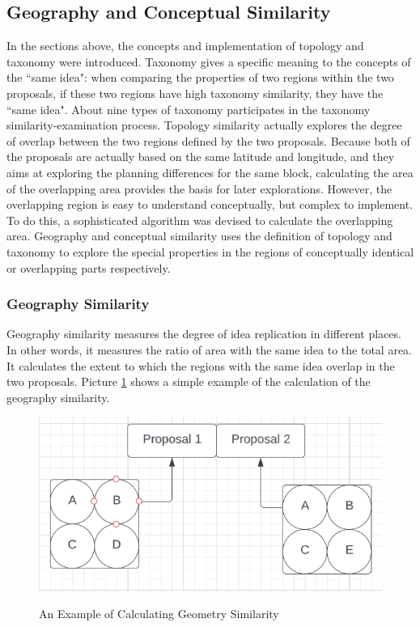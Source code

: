\subsection*{Geography and Conceptual Similarity}
In the sections above, the concepts and implementation of topology and taxonomy were introduced. Taxonomy gives a specific meaning to the concepts of the ``same idea": when comparing the properties of two regions within the two proposals, if these two regions have high taxonomy similarity, they have the ``same idea". About nine types of taxonomy participates in the taxonomy similarity-examination process. Topology similarity actually explores the degree of overlap between the two regions defined by the two proposals. Because both of the proposals are actually based on the same latitude and longitude, and they aims at exploring the planning differences for the same block, calculating the area of the overlapping area provides the basis for later explorations. However, the overlapping region is easy to understand conceptually, but complex to implement. To do this, a sophisticated algorithm was devised to calculate the overlapping area. Geography and conceptual similarity uses the definition of topology and taxonomy to explore the special properties in the regions of conceptually identical or overlapping parts respectively.
\subsubsection*{Geography Similarity}
Geography similarity measures the degree of idea replication in different places. In other words, it measures the ratio of area with the same idea to the total area. It calculates the extent to which the regions with the same idea overlap in the two proposals. Picture \ref{geo1} shows a simple example of the calculation of the geography similarity. 

\begin{figure}[H]
\caption{An Example of Calculating Geometry Similarity}
\centering
\includegraphics[scale=0.7]{Geo-1.png}
\label{geo1}
\end{figure}

